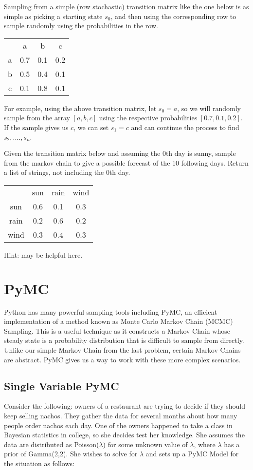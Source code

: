 Sampling from a simple (row stochastic) transition matrix like the one below is as simple as picking a starting state $s_0$, and then using the corresponding row to sample randomly using the probabilities in the row. 
\begin{center}
  \begin{tabular}{c c c c}
    & a & b & c\\
    a & 0.7 & 0.1 & 0.2\\
    b & 0.5 & 0.4 & 0.1\\
    c & 0.1 & 0.8 & 0.1
  \end{tabular}
\end{center}
For example, using the above transition matrix, let $s_0=a$, so we will randomly sample from the array $[a,b,c]$ using the respective probabilities $[0.7,0.1,0.2]$.
If the sample gives us $c$, we can set $s_1=c$ and can continue the process to find $s_2,....,s_n$.

\begin{problem}
Given the transition matrix below and assuming the 0th day is sunny, sample from the markov chain to give a possible forecast of the 10 following days.
Return a list of strings, not including the 0th day.
\begin{center}
  \begin{tabular}{c c c c}
    & sun & rain & wind\\
    sun & 0.6 & 0.1 & 0.3\\
    rain & 0.2 & 0.6 & 0.2\\
    wind & 0.3 & 0.4 & 0.3
  \end{tabular} 
\end{center}
Hint:  may be helpful here.
\end{problem} 

\section*{PyMC}
Python has many powerful sampling tools including PyMC, an efficient implementation of a method known as Monte Carlo Markov Chain (MCMC) Sampling.
This is a useful technique as it constructs a Markov Chain whose steady state is a probability distribution that is difficult to sample from directly.
Unlike our simple Markov Chain from the last problem, certain Markov Chains are abstract.
PyMC gives us a way to work with these more complex scenarios.

\subsection*{Single Variable PyMC}
Consider the following: owners of a restaurant are trying to decide if they should keep selling nachos.
They gather the data for several months about how many people order nachos each day.
One of the owners happened to take a class in Bayesian statistics in college, so she decides test her knowledge.
She assumes the data are distributed as Poisson($\lambda$) for some unknown value of $\lambda$, where $\lambda$ has a prior of Gamma(2,2).
She wishes to solve for $\lambda$ and sets up a PyMC Model for the situation as follows: 

